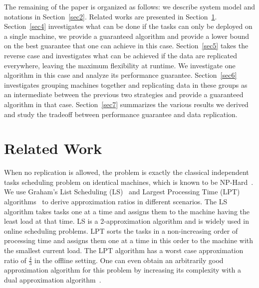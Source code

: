 \documentclass[twocolumn]{svjour3}
\begin{document}
The remaining of the paper is organized as follows: we describe system
model and notations in Section~\ref{sec2}. Related works are presented
in Section~\ref{sec3}.  Section~\ref{sec4} investigates what can be
done if the tasks can only be deployed on a single machine, we
provide a guaranteed algorithm and provide a lower bound on the best
guarantee that one can achieve in this case. Section~\ref{sec5} takes
the reverse case and investigates what can be achieved if the data are
replicated everywhere, leaving the maximum flexibility at runtime. We
investigate one algorithm in this case and analyze its performance
guarantee. Section~\ref{sec6} investigates grouping machines
together and replicating data in these groups as an intermediate
between the previous two strategies and provide a guaranteed algorithm
in that case. Section~\ref{sec7} summarizes the various results we
derived and study the tradeoff between performance guarantee and data
replication.


\section{Related Work}\label{sec3}

When no replication is allowed, the problem is exactly the classical
independent tasks scheduling problem on identical machines, which is
known to be NP-Hard~\cite{GareyJohnson79}. We use Graham's List
Scheduling (LS)~\cite{Graham66} and Largest Processing Time (LPT)
algorithms~\cite{Graham69boundson} to derive approximation ratios in
different scenarios. The LS algorithm takes tasks one at a time and
assigns them to the machine having the least load at that time. LS is
a 2-approximation algorithm and is widely used in online scheduling
problems. LPT sorts the tasks in a non-increasing order of processing
time and assigns them one at a time in this order to the machine with
the smallest current load. The LPT algorithm has a worst case
approximation ratio of $\frac{4}{3}$ in the offline
setting. One can even obtain an arbitrarily good approximation
algorithm for this problem by increasing its complexity with a dual
approximation algorithm~\cite{Hoch87}.
\end{document}
